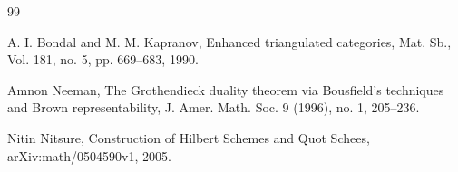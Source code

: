 \documentclass[10pt]{article}
\newtheorem{prop}[thm]{Proposition}
\theoremstyle{definition}
\newtheorem{exmp}[thm]{Example}
\newcommand{\PP}{\mathbb{P}}
\newcommand{\Z}{\mathbb{Z}}
\newcommand{\todo}[1]{\textbf{\textcolor{red}{TODO #1}}}
\begin{document}
%
%
%
%
%
%
%
%


\newpage


\begin{thebibliography}{99}

	A. I. Bondal and M. M. Kapranov,
	Enhanced triangulated categories,
	Mat. Sb., Vol. 181, no. 5, pp. 669–683,
	1990.

	Amnon Neeman,
	The Grothendieck duality theorem via Bousfield's techniques and Brown representability,
	 J. Amer. Math. Soc. 9 (1996), no. 1, 205–236.
		
	Nitin Nitsure,
	Construction of Hilbert Schemes and Quot Schees,
	arXiv:math/0504590v1,
	2005.
		
\end{thebibliography}
\end{document}

